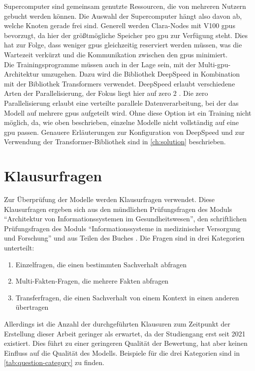 Supercomputer sind gemeinsam genutzte Ressourcen, die von mehreren Nutzern gebucht werden können.
Die Auswahl der Supercomputer hängt also davon ab, welche Knoten gerade frei sind.
Generell werden Clara-Nodes mit V100 \ac{gpu}s bevorzugt, da hier der größtmögliche Speicher pro \ac{gpu} zur Verfügung steht.
Dies hat zur Folge, dass weniger \ac{gpu}s gleichzeitig reserviert werden müssen, was die Wartezeit verkürzt und die Kommunikation zwischen den \ac{gpu}s minimiert.\\

Die Trainingsprogramme müssen auch in der Lage sein, mit der Multi-\ac{gpu}-Architektur umzugehen.
Dazu wird die Bibliothek DeepSpeed \citep{deepspeed} in Kombination mit der Bibliothek Transformers verwendet.
DeepSpeed erlaubt verschiedene Arten der Parallelisierung, der Fokus liegt hier auf \ac{zero} 2 \citep{deepspeed}.
Die \ac{zero} Parallelisierung erlaubt eine verteilte parallele Datenverarbeitung, bei der das Modell auf mehrere \ac{gpu}s aufgeteilt wird.
Ohne diese Option ist ein Training nicht möglich, da, wie oben beschrieben, einzelne Modelle nicht vollständig auf eine \ac{gpu} passen.
Genauere Erläuterungen zur Konfiguration von DeepSpeed und zur Verwendung der Transformer-Bibliothek sind in \cref{ch:solution} beschrieben.

\section{Klausurfragen}\label{sec:approach:questions}
Zur Überprüfung der Modelle werden Klausurfragen verwendet.
Diese Klausurfragen ergeben sich aus den mündlichen Prüfungsfragen des Moduls \enquote{Architektur von Informationssystemen im Gesundheitswesen},
den schriftlichen Prüfungsfragen des Moduls \enquote{Informationssysteme in medizinischer Versorgung und Forschung} und aus Teilen des Buches \citet{bb}.
Die Fragen sind in drei Kategorien unterteilt:
\begin{enumerate}
    \item Einzelfragen, die einen bestimmten Sachverhalt abfragen
    \item Multi-Fakten-Fragen, die mehrere Fakten abfragen
    \item Transferfragen, die einen Sachverhalt von einem Kontext in einen anderen übertragen
\end{enumerate}

Allerdings ist die Anzahl der durchgeführten Klausuren zum Zeitpunkt der Erstellung dieser Arbeit geringer als erwartet, da der Studiengang erst seit 2021 existiert.
Dies führt zu einer geringeren Qualität der Bewertung, hat aber keinen Einfluss auf die Qualität des Modells.
Beispiele für die drei Kategorien sind in \cref{tab:question-category} zu finden.\\

